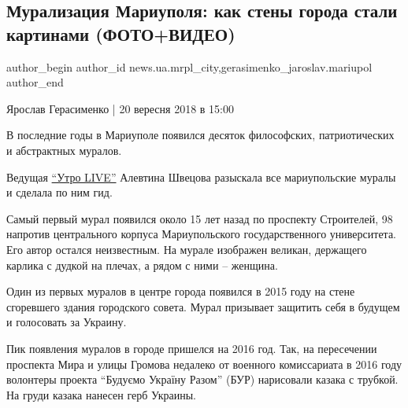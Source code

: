  
 
 
 
 
 
\subsection{Мурализация Мариуполя: как стены города стали картинами (ФОТО+ВИДЕО)}
\label{sec:20_09_2018.stz.news.ua.mrpl_city.1.muralizacia_foto_video}
 
\ifcmt
 author_begin
   author_id news.ua.mrpl_city,gerasimenko_jaroslav.mariupol
 author_end
\fi

Ярослав Герасименко | 20 вересня 2018 в 15:00

В последние годы в Мариуполе появился десяток философских, патриотических и
абстрактных муралов.

Ведущая \href{https://www.facebook.com/morning.live.mtv}{\enquote{Утро LIVE}}
Алевтина Швецова разыскала все мариупольские муралы и сделала по ним гид.

Самый первый мурал появился около 15 лет назад по проспекту Строителей, 98
напротив центрального корпуса Мариупольского государственного университета. Его
автор остался неизвестным. На мурале изображен великан, держащего карлика с
дудкой на плечах, а рядом с ними – женщина.


Один из первых муралов в центре города появился в 2015 году на стене сгоревшего
здания городского совета. Мурал призывает защитить себя в будущем и голосовать
за Украину.


Пик появления муралов в городе пришелся на 2016 год. Так, на пересечении
проспекта Мира и улицы Громова недалеко от военного комиссариата в 2016 году
волонтеры проекта \enquote{Будуємо Україну Разом} (БУР) нарисовали казака с трубкой. На
груди казака нанесен герб Украины.  


